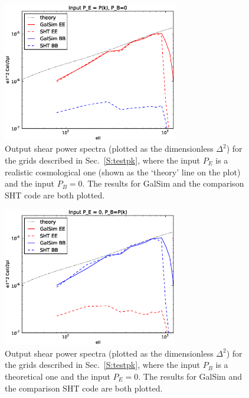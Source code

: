 \documentclass[preprint]{aastex}
\begin{document}
\begin{figure}
\begin{center}
\includegraphics[width=3in]{../external/test_gridshear/output/compare_input_pe.eps}
\caption{Output shear power spectra (plotted as the dimensionless
  $\Delta^2$) for the grids described in Sec.~\ref{S:testpk}, where
  the input $P_E$ is a realistic cosmological one (shown as the `theory' line on
  the plot) and the input $P_B=0$. The results for GalSim and the
  comparison SHT code are both plotted.\label{F:pe}}
\end{center}
\end{figure}

\begin{figure}
\begin{center}
\includegraphics[width=3in]{../external/test_gridshear/output/compare_input_pb.eps}
\caption{Output shear power spectra (plotted as the dimensionless
  $\Delta^2$) for the grids described in Sec.~\ref{S:testpk}, where
  the input $P_B$ is a theoretical one and the input $P_E=0$. The results for GalSim and the
  comparison SHT code are both plotted.\label{F:pb}}
\end{center}
\end{figure}
\end{document}
